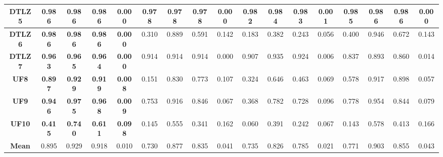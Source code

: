 \begin{table*}[t]
{\begin{tabular}{cc|c|c|c|c|c|c|c|c|c|c|c|c|c|c|c}
\multicolumn{1}{c|}{\textbf{DTLZ5}} & \textbf{0.986} & \textbf{0.986} & \textbf{0.986} & \textbf{0.000} & 0.978          & 0.978          & 0.978          & 0.000          & 0.982        & 0.984        & 0.983         & 0.001        & \textbf{0.985} & \textbf{0.986} & \textbf{0.986} & \textbf{0.000}  \\ \hline
\multicolumn{1}{c|}{\textbf{DTLZ6}} & \textbf{0.986} & \textbf{0.986} & \textbf{0.986} & \textbf{0.000} & 0.310          & 0.889          & 0.591          & 0.142          & 0.183        & 0.382        & 0.243         & 0.056        & 0.400          & 0.946          & 0.672          & 0.143           \\ \hline
\multicolumn{1}{c|}{\textbf{DTLZ7}} & \textbf{0.963} & \textbf{0.965} & \textbf{0.964} & \textbf{0.000} & 0.914          & 0.914          & 0.914          & 0.000          & 0.907        & 0.935        & 0.924         & 0.006        & 0.837          & 0.893          & 0.860          & 0.014           \\ \hline
\multicolumn{1}{c|}{\textbf{UF8}}   & \textbf{0.897} & \textbf{0.929} & \textbf{0.919} & \textbf{0.008} & 0.151          & 0.830          & 0.773          & 0.107          & 0.324        & 0.646        & 0.463         & 0.069        & 0.578          & 0.917          & 0.898          & 0.057           \\ \hline
\multicolumn{1}{c|}{\textbf{UF9}}   & \textbf{0.946} & \textbf{0.975} & \textbf{0.968} & \textbf{0.009} & 0.753          & 0.916          & 0.846          & 0.067          & 0.368        & 0.782        & 0.728         & 0.096        & 0.778          & 0.954          & 0.844          & 0.079           \\ \hline
\multicolumn{1}{c|}{\textbf{UF10}}  & \textbf{0.415} & \textbf{0.740} & \textbf{0.611} & \textbf{0.098} & 0.145          & 0.555          & 0.341          & 0.162          & 0.060        & 0.391        & 0.242         & 0.067        & 0.143          & 0.578          & 0.413          & 0.166           \\ \hline
\multicolumn{1}{c|}{\textbf{Mean}}  & 0.895          & 0.929          & 0.918          & 0.010          & 0.730          & 0.877          & 0.835          & 0.041          & 0.735        & 0.826        & 0.785         & 0.021        & 0.771          & 0.903          & 0.855          & 0.043           \\ \hline
\end{tabular}%
}
\end{table*}




